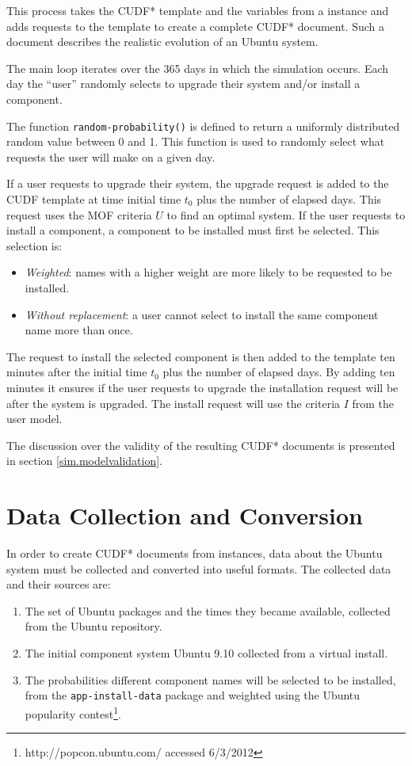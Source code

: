 This process takes the CUDF* template and the variables from a \usermodel instance and adds requests to the template to  create a complete CUDF* document.
Such a document describes the realistic evolution of an Ubuntu system.

The main loop iterates over the 365 days in which the simulation occurs.
Each day the ``user'' randomly selects to upgrade their system and/or install a component.

The function \texttt{random-probability()} is defined to return a uniformly distributed random value between 0 and 1.
This function is used to randomly select what requests the user will make on a given day.

If a user requests to upgrade their system, the upgrade request is added to the CUDF template at time initial time $t_0$ plus the number of elapsed days.
This request uses the MOF criteria $U$ to find an optimal system.
If the user requests to install a component, a component to be installed must first be selected.
This selection is: 
\begin{itemize}
  \item \textit{Weighted}: names with a higher weight are more likely to be requested to be installed.
  \item \textit{Without replacement}: a user cannot select to install the same component name more than once.
\end{itemize} 
The request to install the selected component is then added to the template ten minutes after the initial time $t_0$ plus the number of elapsed days.
By adding ten minutes it ensures if the user requests to upgrade the installation request will be after the system is upgraded.
The install request will use the criteria $I$ from the user model.

The discussion over the validity of the resulting CUDF* documents is presented in section \ref{sim.modelvalidation}.

\section{\usermodel Data Collection and Conversion}
\label{sim.collection}
In order to create CUDF* documents from \usermodel instances, data about the Ubuntu system must be collected and converted into useful formats.
The collected data and their sources are:
\begin{enumerate}
  \item The set of Ubuntu packages and the times they became available, collected from the Ubuntu repository.
  \item The initial component system Ubuntu 9.10 collected from a virtual install.
  \item The probabilities different component names will be selected to be installed, from the \texttt{app-install-data} package and weighted using 
  the Ubuntu popularity contest\footnote{http://popcon.ubuntu.com/ accessed 6/3/2012}.
\end{enumerate}

